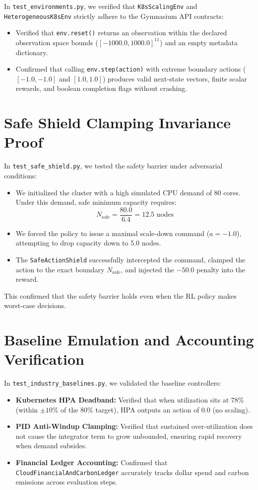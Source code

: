 \documentclass[12pt]{report}
\begin{document}
In \texttt{test\_environments.\allowbreak py}, we verified that \texttt{K8sScalingEnv} and \texttt{HeterogeneousK8sEnv} strictly adhere to the Gymnasium API contracts:
\begin{itemize}
\item Verified that \texttt{env.\allowbreak reset()} returns an observation within the declared observation space bounds ($[-1000.0, 1000.0]^{11}$) and an empty metadata dictionary.
\item Confirmed that calling \texttt{env.\allowbreak step(action)} with extreme boundary actions ($[-1.0, -1.0]$ and $[1.0, 1.0]$) produces valid next-state vectors, finite scalar rewards, and boolean completion flags without crashing.
\end{itemize}

\section{Safe Shield Clamping Invariance Proof}

In \texttt{test\_safe\_shield.\allowbreak py}, we tested the safety barrier under adversarial conditions:
\begin{itemize}
\item We initialized the cluster with a high simulated CPU demand of 80 cores. Under this demand, safe minimum capacity requires:
\begin{equation}
N_{\text{safe}} = \frac{80.0}{6.4} = 12.5 \text{ nodes}
\end{equation}
\item We forced the policy to issue a maximal scale-down command ($a = -1.0$), attempting to drop capacity down to 5.0 nodes.
\item The \texttt{SafeActionShield} successfully intercepted the command, clamped the action to the exact boundary $N_{\text{safe}}$, and injected the $-50.0$ penalty into the reward.
\end{itemize}
This confirmed that the safety barrier holds even when the RL policy makes worst-case decisions.

\section{Baseline Emulation and Accounting Verification}

In \texttt{test\_industry\_baselines.\allowbreak py}, we validated the baseline controllers:
\begin{itemize}
\item \textbf{Kubernetes HPA Deadband:} Verified that when utilization sits at 78\% (within $\pm 10\%$ of the 80\% target), HPA outputs an action of 0.0 (no scaling).
\item \textbf{PID Anti-Windup Clamping:} Verified that sustained over-utilization does not cause the integrator term to grow unbounded, ensuring rapid recovery when demand subsides.
\item \textbf{Financial Ledger Accounting:} Confirmed that \texttt{Cloud\-Financial\-And\-Carbon\-Ledger} accurately tracks dollar spend and carbon emissions across evaluation steps.
\end{itemize}
\end{document}
